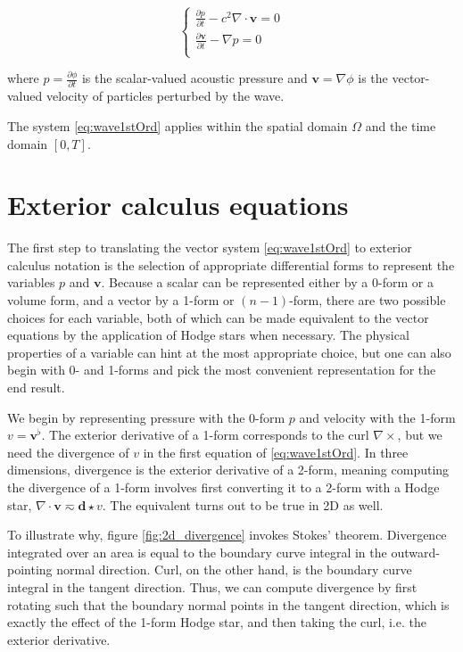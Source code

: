 \documentclass[utf8,english]{gradu3}
\begin{document}
\begin{equation}\label{eq:wave1stOrd}
  \begin{cases}
    \frac{\partial p}{\partial t} - c^2\nabla \cdot \mathbf{v} = 0 \\
    \frac{\partial \mathbf{v}}{\partial t} - \nabla p = 0 \\
  \end{cases}
\end{equation}

where $p = \frac{\partial \phi}{\partial t}$ is the scalar-valued acoustic pressure
and $\mathbf{v} = \nabla \phi$ is the vector-valued velocity
of particles perturbed by the wave.

The system \eqref{eq:wave1stOrd} applies within the spatial domain $\Omega$
and the time domain $[0, T]$.

\section{Exterior calculus equations}

The first step to translating the vector system \eqref{eq:wave1stOrd}
to exterior calculus notation is the selection of appropriate differential forms
to represent the variables $p$ and $\mathbf{v}$.
Because a scalar can be represented either by a 0-form or a volume form,
and a vector by a 1-form or $(n-1)$-form,
there are two possible choices for each variable,
both of which can be made equivalent to the vector equations
by the application of Hodge stars when necessary.
The physical properties of a variable can hint at the most appropriate choice,
but one can also begin with 0- and 1-forms
and pick the most convenient representation for the end result.

We begin by representing pressure with the 0-form $p$
and velocity with the 1-form $v = \mathbf{v}^{\flat}$.
The exterior derivative of a 1-form corresponds to the curl $\nabla \times$,
but we need the divergence of $v$ in the first equation of \eqref{eq:wave1stOrd}.
In three dimensions, divergence is the exterior derivative of a 2-form,
meaning computing the divergence of a 1-form involves first converting
it to a 2-form with a Hodge star, $\nabla \cdot \mathbf{v} \eqsim \mathbf{d}\star v$.
The equivalent turns out to be true in 2D as well.

To illustrate why, figure \ref{fig:2d_divergence} invokes Stokes' theorem.
Divergence integrated over an area is equal to the boundary curve integral
in the outward-pointing normal direction.
Curl, on the other hand, is the boundary curve integral in the tangent direction.
Thus, we can compute divergence by first rotating such that the boundary normal
points in the tangent direction, which is exactly the effect of the 1-form Hodge star,
and then taking the curl, i.e. the exterior derivative.
\end{document}
